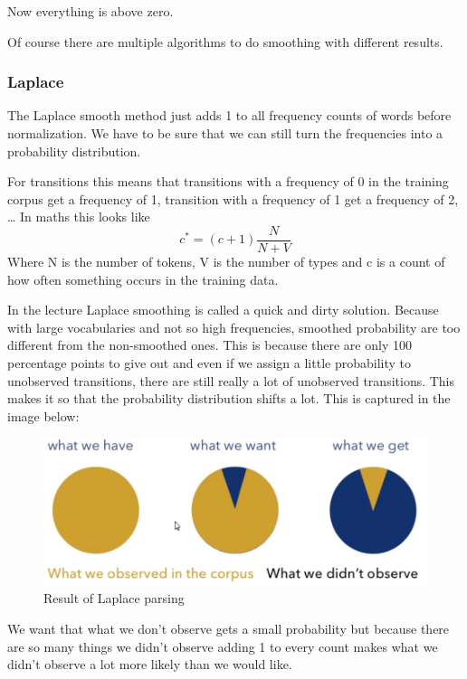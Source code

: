 \documentclass[
  11pt,
  british,
]{article}
\begin{document}
Now everything is above zero.

Of course there are multiple algorithms to do smoothing with different
results.

\hypertarget{laplace}{%
\subsubsection{Laplace}\label{laplace}}

The Laplace smooth method just adds 1 to all frequency counts of words
before normalization. We have to be sure that we can still turn the
frequencies into a probability distribution.

For transitions this means that transitions with a frequency of 0 in the
training corpus get a frequency of 1, transition with a frequency of 1
get a frequency of 2, \ldots{} In maths this looks like
\[c^{*}= (c+1)\frac{N}{N+V}\] Where N is the number of tokens, V is the
number of types and c is a count of how often something occurs in the
training data.

In the lecture Laplace smoothing is called a quick and dirty solution.
Because with large vocabularies and not so high frequencies, smoothed
probability are too different from the non-smoothed ones. This is
because there are only 100 percentage points to give out and even if we
assign a little probability to unobserved transitions, there are still
really a lot of unobserved transitions. This makes it so that the
probability distribution shifts a lot. This is captured in the image
below:

\begin{figure}
\centering
\includegraphics{Pasted_image_20220224154616.png}
\caption{Result of Laplace parsing}
\end{figure}

We want that what we don't observe gets a small probability but because
there are so many things we didn't observe adding 1 to every count makes
what we didn't observe a lot more likely than we would like.
\end{document}
